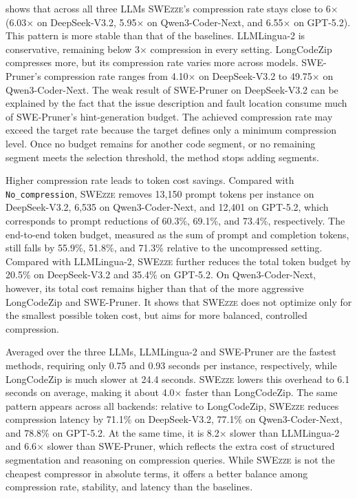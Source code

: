 \documentclass[sigconf,nonacm]{acmart}
\newcommand{\projName}{\textsc{SWEzze}\xspace}
\begin{document}
 shows that across all three LLMs \projName's compression rate stays close to 6$\times$ (6.03$\times$ on DeepSeek-V3.2, 5.95$\times$ on Qwen3-Coder-Next, and 6.55$\times$ on GPT-5.2). This pattern is more stable than that of the baselines. LLMLingua-2 is conservative, remaining below 3$\times$ compression in every setting. LongCodeZip compresses more, but its compression rate varies more across models. SWE-Pruner's compression rate ranges from 4.10$\times$ on DeepSeek-V3.2 to 49.75$\times$ on Qwen3-Coder-Next. The weak result of SWE-Pruner on DeepSeek-V3.2 can be explained by the fact that the issue description and fault location consume much of SWE-Pruner's hint-generation budget. The achieved compression rate may exceed the target rate because the target defines only a minimum compression level. Once no budget remains for another code segment, or no remaining segment meets the selection threshold, the method stops adding segments.

Higher compression rate leads to token cost savings. Compared with \texttt{No\_compression}, \projName removes 13,150 prompt tokens per instance on DeepSeek-V3.2, 6,535 on Qwen3-Coder-Next, and 12,401 on GPT-5.2, which corresponds to prompt reductions of 60.3\%, 69.1\%, and 73.4\%, respectively. The end-to-end token budget, measured as the sum of prompt and completion tokens, still falls by 55.9\%, 51.8\%, and 71.3\% relative to the uncompressed setting. Compared with LLMLingua-2, \projName further reduces the total token budget by 20.5\% on DeepSeek-V3.2 and 35.4\% on GPT-5.2. On Qwen3-Coder-Next, however, its total cost remains higher than that of the more aggressive LongCodeZip and SWE-Pruner. It shows that \projName does not optimize only for the smallest possible token cost, but aims for more balanced, controlled compression.

Averaged over the three LLMs, LLMLingua-2 and SWE-Pruner are the fastest methods, requiring only 0.75 and 0.93 seconds per instance, respectively, while LongCodeZip is much slower at 24.4 seconds. \projName lowers this overhead to 6.1 seconds on average, making it about 4.0$\times$ faster than LongCodeZip. The same pattern appears across all backends: relative to LongCodeZip, \projName reduces compression latency by 71.1\% on DeepSeek-V3.2, 77.1\% on Qwen3-Coder-Next, and 78.8\% on GPT-5.2. At the same time, it is 8.2$\times$ slower than LLMLingua-2 and 6.6$\times$ slower than SWE-Pruner, which reflects the extra cost of structured segmentation and reasoning on compression queries. While \projName is not the cheapest compressor in absolute terms, it offers a better balance among compression rate, stability, and latency than the baselines.
\end{document}
